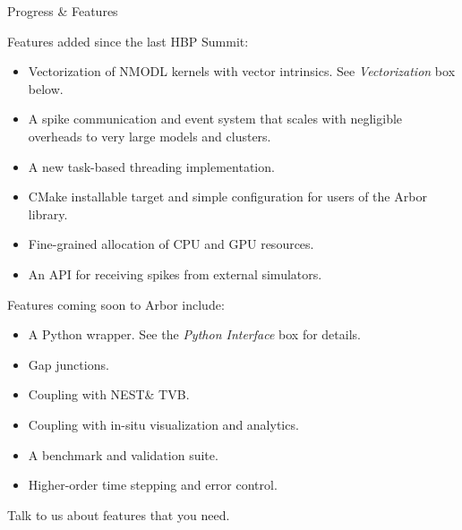 \documentclass[a0paper,portrait]{baposter}
\newcommand{\arborname}{Arbor\xspace}
\newcommand{\arbor}{{\textcolor{blue!30!black}{\arborname}}\xspace}
\newcommand{\arboremph}{{\textcolor{emph!70!black}{\arborname}}\xspace}
\newcommand\nest{{\relsize{-2}NEST}\xspace}
\newcommand\tvb{{\relsize{-2}TVB}\xspace}
\newcommand{\newemph}[1]{{\color{emph}#1}}
\begin{document}
\begin{poster}
\begin{posterbox}[name=progress,column=0,below=motivation,span=1]{Progress \& Features}
    \raggedright
    \newemph{Features added since the last HBP Summit:}
    \vspace{7pt}
    \begin{itemize}
        \item Vectorization of NMODL kernels with vector intrinsics. See \emph{Vectorization} box below.
        \item A spike communication and event system that scales with negligible overheads to very large models and clusters.
        \item A new task-based threading implementation.
        \item CMake installable target and simple configuration for users of the \arbor library.
        \item Fine-grained allocation of CPU and GPU resources.
        \item An API for receiving spikes from external simulators.
    \end{itemize}

    \vspace{7pt}
    \newemph{Features coming soon to \arboremph include:}
    \vspace{7pt}
    \begin{itemize}
        \item A Python wrapper. See the \emph{Python Interface} box for details.
        \item Gap junctions.
        \item Coupling with \nest \& \tvb.
        \item Coupling with in-situ visualization and analytics.
        \item A benchmark and validation suite.
        \item Higher-order time stepping and error control.
    \end{itemize}
    \vspace{-4pt}
    \begin{center}
    \colorbox{yellow!20}{
        \begin{minipage}{0.9\textwidth}
            \centering
            Talk to us about features that you need.
        \end{minipage}
    }
    \end{center}

    \vspace{0pt}
\end{posterbox}


\end{poster}
\end{document}
